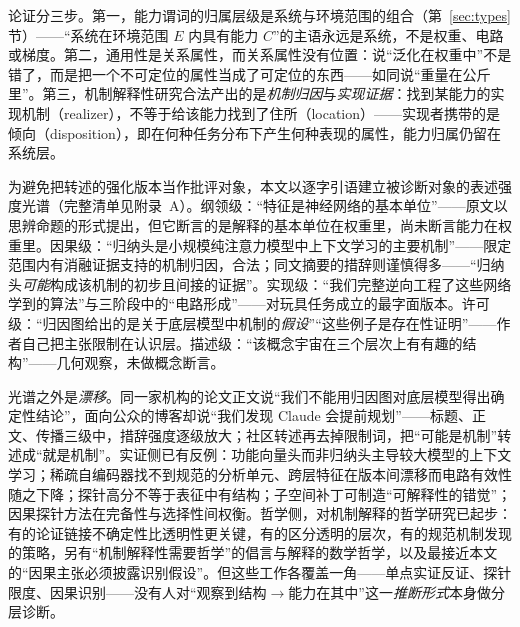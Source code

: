 \documentclass[10pt,fontset=fandol]{ctexart}
\begin{document}
论证分三步。第一，能力谓词的归属层级是系统与环境范围的组合（第~\ref{sec:types} 节）——“系统在环境范围 $E$ 内具有能力 $C$”的主语永远是系统，不是权重、电路或梯度。第二，通用性是关系属性\cite{yu2026theory}，而关系属性没有位置：说“泛化在权重中”不是错了，而是把一个不可定位的属性当成了可定位的东西——如同说“重量在公斤里”。第三，机制解释性研究合法产出的是\emph{机制归因}与\emph{实现证据}：找到某能力的实现机制（realizer），不等于给该能力找到了住所（location）——实现者携带的是倾向（disposition），即在何种任务分布下产生何种表现的属性，能力归属仍留在系统层。

为避免把转述的强化版本当作批评对象，本文以逐字引语建立被诊断对象的表述强度光谱（完整清单见附录~A）。纲领级：“特征是神经网络的基本单位”\cite{olah2020zoomin}——原文以思辨命题的形式提出，但它断言的是解释的基本单位在权重里，尚未断言能力在权重里。因果级：“归纳头是小规模纯注意力模型中上下文学习的主要机制”\cite{olsson2022induction}——限定范围内有消融证据支持的机制归因，合法；同文摘要的措辞则谨慎得多——“归纳头\emph{可能}构成该机制的初步且间接的证据”。实现级：“我们完整逆向工程了这些网络学到的算法”与三阶段中的“电路形成”\cite{nanda2023progress}——对玩具任务成立的最字面版本。许可级：“归因图给出的是关于底层模型中机制的\emph{假设}”“这些例子是存在性证明”\cite{lindsey2025biology}——作者自己把主张限制在认识层。描述级：“该概念宇宙在三个层次上有有趣的结构”\cite{tegmark2024geometry}——几何观察，未做概念断言。

光谱之外是\emph{漂移}。同一家机构的论文正文说“我们不能用归因图对底层模型得出确定性结论”\cite{lindsey2025biology}，面向公众的博客却说“我们发现 Claude 会提前规划”\cite{anthropic2025thoughts}——标题、正文、传播三级中，措辞强度逐级放大；社区转述再去掉限制词，把“可能是机制”转述成“就是机制”。实证侧已有反例：功能向量头而非归纳头主导较大模型的上下文学习\cite{yin2025which}；稀疏自编码器找不到规范的分析单元\cite{leask2025canonical}、跨层特征在版本间漂移而电路有效性随之下降\cite{anthropic2024crosscoders}；探针高分不等于表征中有结构\cite{hewitt2019designing,belinkov2022probing}；子空间补丁可制造“可解释性的错觉”\cite{makelov2023illusion}；因果探针方法在完备性与选择性间权衡\cite{canby2024reliable}。哲学侧，对机制解释的哲学研究已起步：有的论证链接不确定性比透明性更关键\cite{sullivan2022understanding}，有的区分透明的层次\cite{creel2022transparency}，有的规范机制发现的策略\cite{kastner2024explaining}，另有“机制解释性需要哲学”的倡言\cite{williams2025philosophy}与解释的数学哲学\cite{ayonrinde2025mathematical}，以及最接近本文的“因果主张必须披露识别假设”\cite{lin2026disclose}。但这些工作各覆盖一角——单点实证反证、探针限度、因果识别——没有人对“观察到结构$\to$能力在其中”这一\emph{推断形式}本身做分层诊断。
\end{document}
